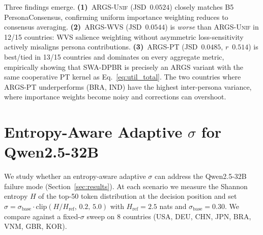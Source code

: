 \documentclass{article}
\begin{document}
Three findings emerge. \textbf{(1)}~\textsc{ARGS-Unif} (JSD~$0.0524$) closely
matches B5 PersonaConsensus, confirming uniform importance weighting reduces to
consensus averaging. \textbf{(2)}~\textsc{ARGS-WVS} (JSD~$0.0544$) is
\emph{worse} than \textsc{ARGS-Unif} in 12/15 countries: WVS salience weighting
without asymmetric loss-sensitivity actively misaligns persona contributions.
\textbf{(3)}~\textsc{ARGS-PT} (JSD~$0.0485$, $r$~$0.514$) is best/tied in 13/15
countries and dominates on every aggregate metric, empirically showing that
SWA-DPBR is precisely an ARGS variant with the same cooperative PT kernel as
Eq.~\ref{eq:util_total}. The two countries where \textsc{ARGS-PT}
underperforms (BRA, IND) have the highest inter-persona variance, where
importance weights become noisy and corrections can overshoot.

\section{Entropy-Aware Adaptive $\sigma$ for Qwen2.5-32B}
\label{app:adaptive_sigma}

We study whether an entropy-aware adaptive $\sigma$ can address the Qwen2.5-32B
failure mode (Section~\ref{sec:results}). At each scenario we measure the Shannon
entropy $H$ of the top-50 token distribution at the decision position and set
$\sigma=\sigma_\text{base}\cdot\text{clip}(H/H_\text{ref},\,0.2,\,5.0)$ with
$H_\text{ref}{=}2.5$ nats and $\sigma_\text{base}{=}0.30$. We compare against a
fixed-$\sigma$ sweep on 8 countries (USA, DEU, CHN, JPN, BRA, VNM, GBR, KOR).
\end{document}
